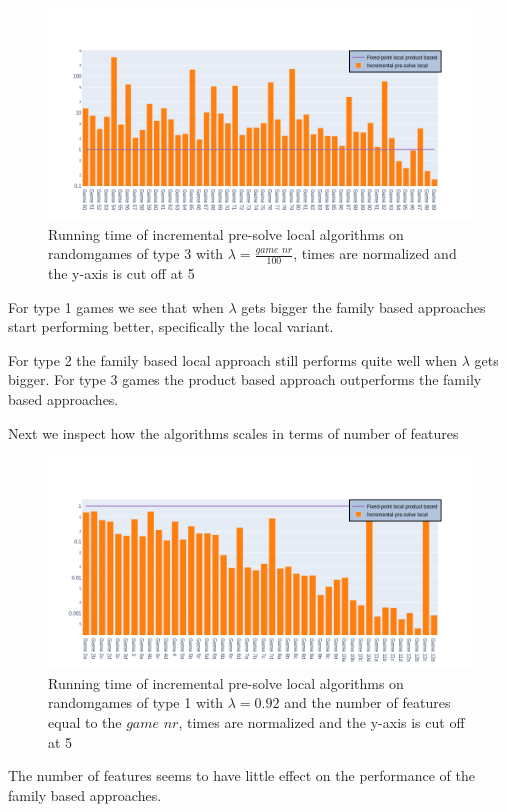\begin{figure}[H]
	\includegraphics[width=1\linewidth]{"results/BC_randomgames/Fixed-point local product based_Incremental pre-solve local_"}
	\caption{Running time of incremental pre-solve local algorithms on randomgames of type 3 with $\lambda = \frac{\textit{game nr}}{100}$, times are normalized and the y-axis is cut off at 5}
	\label{fig:elevatorzlnks}
\end{figure}%
For type 1 games we see that when $\lambda$ gets bigger the family based approaches start performing better, specifically the local variant.

For type 2 the family based local approach still performs quite well when $\lambda$ gets bigger. For type 3 games the product based approach outperforms the family based approaches.

Next we inspect how the algorithms scales in terms of number of features
\begin{figure}[H]
	\includegraphics[width=1\linewidth]{"results/randomscalegames/Fixed-point local product based_Incremental pre-solve local_"}
	\caption{Running time of incremental pre-solve local algorithms on randomgames of type 1 with $\lambda = 0.92$ and the number of features equal to the $\textit{game nr}$, times are normalized and the y-axis is cut off at 5}
	\label{fig:elevatorzlnks}
\end{figure}%
The number of features seems to have little effect on the performance of the family based approaches.

